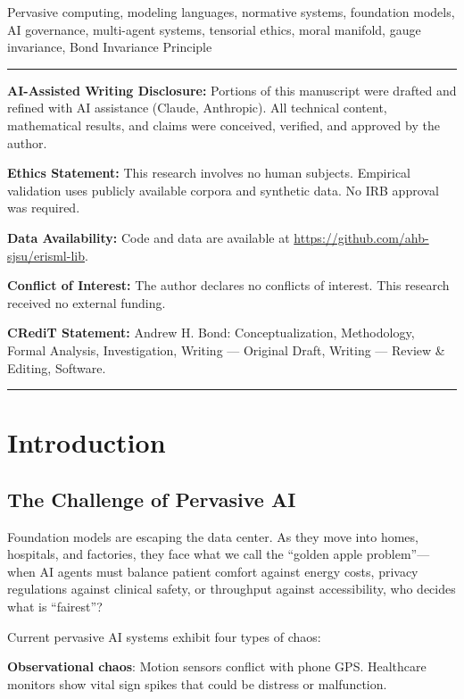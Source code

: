 \documentclass[conference]{IEEEtran}
\begin{document}
\begin{IEEEkeywords}
Pervasive computing, modeling languages, normative systems, foundation models, AI governance, multi-agent systems, tensorial ethics, moral manifold, gauge invariance, Bond Invariance Principle
\end{IEEEkeywords}

\vspace{1em}
\noindent\rule{\linewidth}{0.4pt}
\small
\noindent\textbf{AI-Assisted Writing Disclosure:} Portions of this manuscript were drafted and refined with AI assistance (Claude, Anthropic). All technical content, mathematical results, and claims were conceived, verified, and approved by the author.

\noindent\textbf{Ethics Statement:} This research involves no human subjects. Empirical validation uses publicly available corpora and synthetic data. No IRB approval was required.

\noindent\textbf{Data Availability:} Code and data are available at \url{https://github.com/ahb-sjsu/erisml-lib}.

\noindent\textbf{Conflict of Interest:} The author declares no conflicts of interest. This research received no external funding.

\noindent\textbf{CRediT Statement:} Andrew H. Bond: Conceptualization, Methodology, Formal Analysis, Investigation, Writing --- Original Draft, Writing --- Review \& Editing, Software.
\noindent\rule{\linewidth}{0.4pt}
\normalsize
\vspace{1em}

\section{Introduction}
\label{sec:introduction}

\subsection{The Challenge of Pervasive AI}

Foundation models are escaping the data center. As they move into homes,
hospitals, and factories, they face what we call the ``golden apple
problem''---when AI agents must balance patient comfort against energy
costs, privacy regulations against clinical safety, or throughput
against accessibility, who decides what is ``fairest''?

Current pervasive AI systems exhibit four types of chaos:

\textbf{Observational chaos}: Motion sensors conflict with phone GPS.
Healthcare monitors show vital sign spikes that could be distress or
malfunction.
\end{document}

